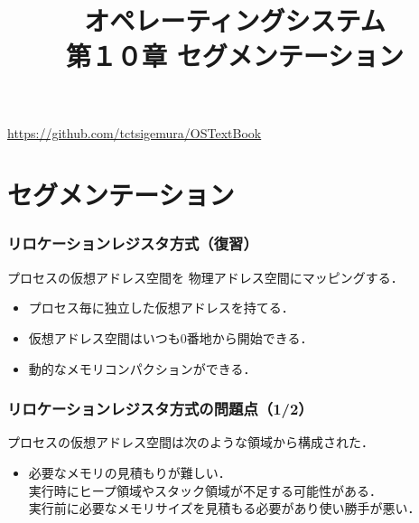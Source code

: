 \documentclass[unicode,handout]{beamer}                   %
\begin{document}
\title[セグメンテーション]
      {オペレーティングシステム\\第１０章 セグメンテーション}
\date{}
\begin{frame}
  \titlepage
  \centerline{\url{https://github.com/tctsigemura/OSTextBook}}
\end{frame}


\section{セグメンテーション}
\begin{frame}
  \frametitle{リロケーションレジスタ方式（復習）}
  プロセスの仮想アドレス空間を
  物理アドレス空間にマッピングする．
  \vspace{3mm}
  \begin{itemize}
  \item プロセス毎に独立した仮想アドレスを持てる．
  \item 仮想アドレス空間はいつも0番地から開始できる．
  \item 動的なメモリコンパクションができる．
  \end{itemize}
\end{frame}

\begin{frame}
  \frametitle{リロケーションレジスタ方式の問題点（1/2）}
  プロセスの仮想アドレス空間は次のような領域から構成された．
  \vspace{3mm}
  \begin{itemize}
  \item 必要なメモリの見積もりが難しい．\\
    実行時にヒープ領域やスタック領域が不足する可能性がある．\\
    実行前に必要なメモリサイズを見積もる必要があり使い勝手が悪い．
  \end{itemize}
\end{frame}
\end{document}
